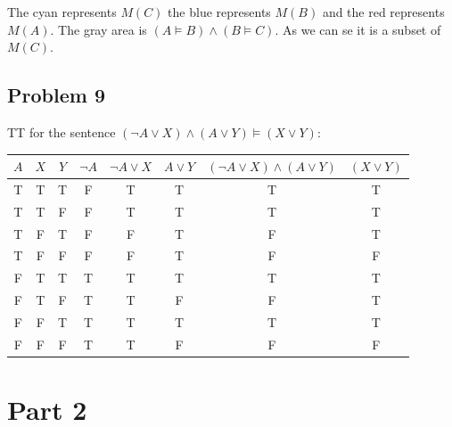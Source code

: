 \documentclass{article}
\begin{document}
The cyan represents $M(C)$ the blue represents $M(B)$ and the red represents $M(A)$. The gray area is $(A \models B) \wedge (B \models C)$. As we can se it is a subset of $M(C)$.

\subsection{Problem 9}

TT for the sentence $(\neg A \vee X) \wedge (A \vee Y) \models (X \vee Y)$:

\begin{tabular}{ | c | c | c | c | c | c | c | c | }
\hline
{\bf $A$} & {\bf $X$} & {\bf $Y$} & {\bf $\neg A$} & {\bf $\neg A \vee X$} & {\bf $A \vee Y$} & {\bf $(\neg A \vee X) \wedge (A \vee Y)$} & {\bf $(X \vee Y)$} \\
\hline
T & T & T & F & T & T & T & T \\
\hline
T & T & F & F & T & T & T & T \\
\hline
T & F & T & F & F & T & F & T \\
\hline
T & F & F & F & F & T & F & F \\
\hline
F & T & T & T & T & T & T & T \\
\hline
F & T & F & T & T & F & F & T \\
\hline
F & F & T & T & T & T & T & T \\
\hline
F & F & F & T & T & F & F & F \\
\hline
\end{tabular}

\section{Part 2}
\end{document}
